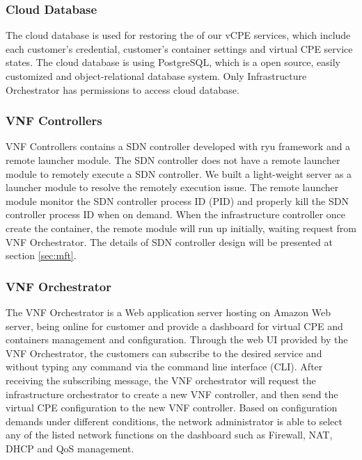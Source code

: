 \documentclass[journal]{IEEEtran}
\begin{document}
\subsubsection{Cloud Database}

The cloud database is used for restoring the of our vCPE services, which include each customer’s credential, customer’s container settings and virtual CPE service states. The cloud database is using PostgreSQL, which is a open source, easily customized and object-relational database system. Only Infrastructure Orchestrator has permissions to access cloud database.

\subsubsection{VNF Controllers}

VNF Controllers contains a SDN controller developed with ryu framework\cite{web:ryu} and a remote launcher module. The SDN controller does not have a remote launcher module to remotely execute a SDN controller. We built a light-weight server as a launcher module to resolve the remotely execution issue. The remote launcher module monitor the SDN controller process ID (PID) and properly kill the SDN controller process ID when on demand. When the infrastructure controller once create the container, the remote module will run up initially, waiting request from VNF Orchestrator. The details of SDN controller design will be presented at section \ref{sec:mft}.

\subsubsection{VNF Orchestrator}

The VNF Orchestrator is a Web application server hosting on Amazon Web server, being online for customer and provide a dashboard for virtual CPE and containers management and configuration.
Through the web UI provided by the VNF Orchestrator, the customers can subscribe to the desired service and without typing any command via the command line interface (CLI). After receiving the subscribing message, the VNF orchestrator will request the infrastructure orchestrator to create a new VNF controller, and then send the virtual CPE configuration to the new VNF controller. Based on configuration demands under different conditions, the network administrator is able to select any of the listed network functions on the dashboard such as Firewall, NAT, DHCP and QoS management.
\end{document}
